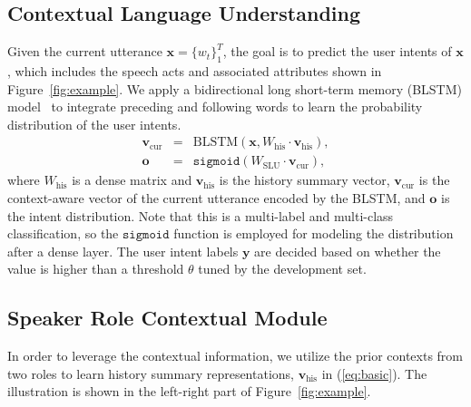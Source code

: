 \documentclass{article}
\begin{document}
\subsection{Contextual Language Understanding }
\label{ssec:clu}
Given the current utterance $\textbf{x}=\{w_t\}^T_1$, the goal is to predict the user intents of $\textbf{x}$, which includes the speech acts and associated attributes shown in Figure~\ref{fig:example}.
We apply a bidirectional long short-term memory (BLSTM) model~\cite{schuster1997bidirectional} to integrate preceding and following words to learn the probability distribution of the user intents.
\begin{eqnarray}
\label{eq:basic}
\textbf{v}_\text{cur} &=& \text{BLSTM}(\textbf{x}, W_\text{his}\cdot \textbf{v}_\text{his}),\\
\textbf{o} &=& \mathtt{sigmoid}(W_\text{SLU}\cdot \textbf{v}_\text{cur}),
\end{eqnarray}
where $W_\text{his}$ is a dense matrix and $\textbf{v}_\text{his}$ is the history summary vector, $\textbf{v}_\text{cur}$ is the context-aware vector of the current utterance encoded by the BLSTM, and $\textbf{o}$ is the intent distribution.
Note that this is a multi-label and multi-class classification, so the $\mathtt{sigmoid}$ function is employed for modeling the distribution after a dense layer.
The user intent labels $\textbf{y}$ are decided based on whether the value is higher than a threshold $\theta$ tuned by the development set.
\subsection{Speaker Role Contextual Module}
\label{ssec:contexualmodel}
In order to leverage the contextual information, we utilize the prior contexts from two roles to learn history summary representations, $\textbf{v}_\text{his}$ in (\ref{eq:basic}).
The illustration is shown in the left-right part of Figure~\ref{fig:example}.
\end{document}
